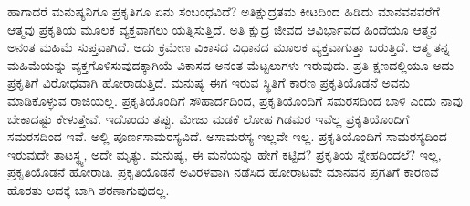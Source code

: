 ಹಾಗಾದರೆ ಮನುಷ್ಯನಿಗೂ ಪ್ರಕೃತಿಗೂ ಏನು ಸಂಬಂಧವಿದೆ? ಅತಿಕ್ಷುದ್ರತಮ ಕೀಟದಿಂದ ಹಿಡಿದು ಮಾನವನವರೆಗೆ ಆತ್ಮವು ಪ್ರಕೃತಿಯ ಮೂಲಕ ವ್ಯಕ್ತವಾಗಲು ಯತ್ನಿಸುತ್ತಿದೆ. ಅತಿ ಕ್ಷುದ್ರ ಜೀವದ ಆವಿರ್ಭಾವದ ಹಿಂದೆಯೂ ಆತ್ಮನ ಅನಂತ ಮಹಿಮೆ ಸುಪ್ತವಾಗಿದೆ. ಅದು ಕ್ರಮೇಣ ವಿಕಾಸದ ವಿಧಾನದ ಮೂಲಕ ವ್ಯಕ್ತವಾಗುತ್ತಾ ಬರುತ್ತಿದೆ. ಆತ್ಮ ತನ್ನ ಮಹಿಮೆಯನ್ನು ವ್ಯಕ್ತಗೊಳಿಸುವುದಕ್ಕಾಗಿಯೆ ವಿಕಾಸದ ಅನಂತ ಮೆಟ್ಟಲುಗಳು ಇರುವುದು. ಪ್ರತಿ ಕ್ಷಣದಲ್ಲಿಯೂ ಅದು ಪ್ರಕೃತಿಗೆ ವಿರೋಧವಾಗಿ ಹೋರಾಡುತ್ತಿದೆ. ಮನುಷ್ಯ ಈಗ ಇರುವ ಸ್ಥಿತಿಗೆ ಕಾರಣ ಪ್ರಕೃತಿಯೊಡನೆ ಅವನು ಮಾಡಿಕೊಳ್ಳುವ ರಾಜಿಯಲ್ಲ. ಪ್ರಕೃತಿಯೊಂದಿಗೆ ಸೌಹಾರ್ದದಿಂದ, ಪ್ರಕೃತಿಯೊಂದಿಗೆ ಸಮರಸದಿಂದ ಬಾಳಿ ಎಂದು ನಾವು ಬೇಕಾದಷ್ಟು ಕೇಳುತ್ತೇವೆ. ಇದೊಂದು ತಪ್ಪು. ಮೇಜು ಮಡಕೆ ಲೋಹ ಗಿಡಮರ ಇವೆಲ್ಲ ಪ್ರಕೃತಿಯೊಂದಿಗೆ ಸಮರಸದಿಂದ ಇವೆ. ಅಲ್ಲಿ ಪೂರ್ಣಸಾಮರಸ್ಯವಿದೆ. ಅಸಾಮರಸ್ಯ ಇಲ್ಲವೇ ಇಲ್ಲ. ಪ್ರಕೃತಿಯೊಂದಿಗೆ ಸಾಮರಸ್ಯದಿಂದ ಇರುವುದೇ ತಾಟಸ್ಥ್ಯ, ಅದೇ ಮೃತ್ಯು. ಮನುಷ್ಯ, ಈ ಮನೆಯನ್ನು ಹೇಗೆ ಕಟ್ಟಿದ? ಪ್ರಕೃತಿಯ ಸ್ನೇಹದಿಂದಲೆ? ಇಲ್ಲ, ಪ್ರಕೃತಿಯೊಡನೆ ಹೋರಾಡಿ. ಪ್ರಕೃತಿಯೊಡನೆ ಅವಿರಳವಾಗಿ ನಡೆಸಿದ ಹೋರಾಟವೇ ಮಾನವನ ಪ್ರಗತಿಗೆ ಕಾರಣವೆ ಹೊರತು ಅದಕ್ಕೆ ಬಾಗಿ ಶರಣಾಗುವುದಲ್ಲ.

